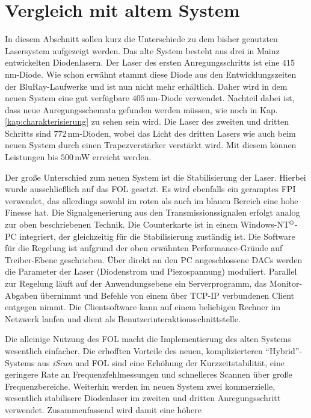 \section{Vergleich mit altem System}\label{sec:vergleich_mit_altem_system}
In diesem Abschnitt sollen kurz die Unterschiede zu dem bisher genutzten
Lasersystem aufgezeigt werden. Das alte System besteht aus drei in Mainz
entwickelten Diodenlasern. Der Laser des ersten Anregungsschritts ist eine
$415\,$nm-Diode. Wie schon erwähnt stammt diese Diode aus den Entwicklungszeiten
der BluRay-Laufwerke und ist nun nicht mehr erhältlich. Daher wird in dem neuen
System eine gut verfügbare $405\,$nm-Diode verwendet. Nachteil dabei ist, dass
neue Anregungsschemata gefunden werden müssen, wie noch in Kap.
\ref{kap:charakterisierung} zu sehen sein wird. Die Laser des zweiten und
dritten Schritts sind $772\,$nm-Dioden, wobei das Licht des dritten Lasers wie
auch beim neuen System durch einen Trapezverstärker verstärkt wird. Mit diesem
können Leistungen bis $500\,$mW erreicht werden.\par
Der große Unterschied zum neuen System ist die Stabilisierung der Laser. Hierbei
wurde ausschließlich auf das FOL gesetzt. Es wird ebenfalls
ein geramptes FPI verwendet, das allerdings sowohl im roten als auch im blauen
Bereich eine hohe Finesse hat. Die Signalgenerierung aus den
Transmissionssignalen erfolgt analog zur oben beschriebenen Technik. Die
Counterkarte ist in einem Windows-NT$^\text{\textregistered}$-PC integriert, der
gleichzeitig für die Stabilisierung zuständig ist. Die Software für die Regelung
ist aufgrund der oben erwähnten Performance-Gründe auf Treiber-Ebene
geschrieben. Über direkt an den PC angeschlossene DACs werden die Parameter der
Laser (Diodenstrom und Piezospannung) moduliert. Parallel zur Regelung läuft auf
der Anwendungsebene ein Serverprogramm, das Monitor-Abgaben übernimmt und
Befehle von einem über TCP-IP verbundenen Client entgegen nimmt. Die
Clientsoftware kann auf einem beliebigen Rechner im Netzwerk laufen und dient
als Benutzerinteraktionsschnittstelle.\par
Die alleinige Nutzung des FOL macht die Implementierung des
alten Systems wesentlich einfacher. Die erhofften Vorteile des neuen,
komplizierteren "`Hybrid"'-Systems aus \textit{iScan} und FOL
sind eine Erhöhung der Kurzzeitstabilität, eine geringere Rate an Frequenzfehlmessungen
und schnelleres Scannen über große Frequenzbereiche. Weiterhin werden im neuen
System zwei kommerzielle, wesentlich stabilisere Diodenlaser im zweiten und
dritten Anregungsschritt verwendet. Zusammenfassend wird damit eine höhere
